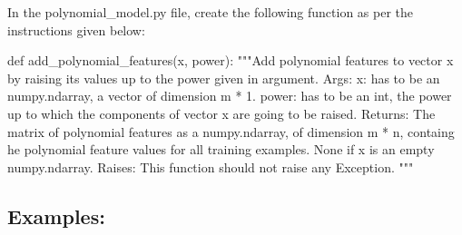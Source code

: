 \documentclass[]{article}
\newenvironment{Shaded}{\begin{snugshade}}{\end{snugshade}}
\newcommand{\CommentTok}[1]{\textcolor[rgb]{0.48,0.49,0.49}{#1}}
\newcommand{\KeywordTok}[1]{\textcolor[rgb]{0.81,0.81,0.76}{#1}}
\newcommand{\NormalTok}[1]{\textcolor[rgb]{0.81,0.81,0.76}{#1}}
\begin{document}
In the polynomial\_model.py file, create the following function as per
the instructions given below:

\begin{Shaded}
\begin{Highlighting}[]
\KeywordTok{def}\NormalTok{ add_polynomial_features(x, power):}
    \CommentTok{"""Add polynomial features to vector x by raising its values up to the power given in argument.  }
\CommentTok{    Args:}
\CommentTok{      x: has to be an numpy.ndarray, a vector of dimension m * 1.}
\CommentTok{      power: has to be an int, the power up to which the components of vector x are going to be raised.}
\CommentTok{    Returns:}
\CommentTok{      The matrix of polynomial features as a numpy.ndarray, of dimension m * n, containg he polynomial feature values for all training examples.}
\CommentTok{      None if x is an empty numpy.ndarray.}
\CommentTok{    Raises:}
\CommentTok{      This function should not raise any Exception.}
\CommentTok{    """}
\end{Highlighting}
\end{Shaded}

\hypertarget{examples-9}{%
\subsection{Examples:}\label{examples-9}}
\end{document}
